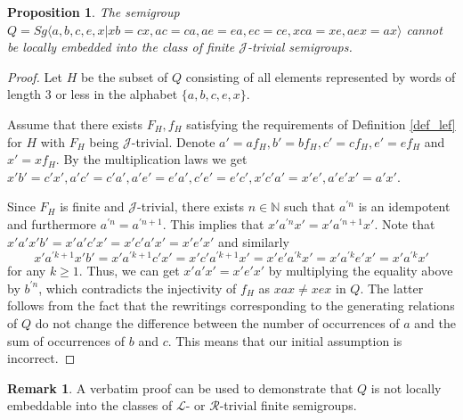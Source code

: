 \documentclass{article}
\newtheorem{proposition}{Proposition}
\theoremstyle{definition}
\newtheorem{remark}{Remark}
\def\NN{{\mathbb N}}
\def\J{\mathcal J}
\begin{document}
\begin{proposition}
The semigroup  $Q = Sg \langle a,b,c,e,x | xb = cx, ac = ca, ae=ea, ec=ce, xca = xe, aex = ax\rangle$ cannot be locally embedded into the class of finite $\J$-trivial semigroups.
\end{proposition}
\begin{proof}
Let $H$ be the subset of $Q$ consisting of all elements represented by words of length $3$ or less in the alphabet $\{a,b,c,e,x\}$.

Assume that there exists $F_H, f_H$ satisfying the requirements of Definition \ref{def_lef} for $H$ with $F_H$ being $\J$-trivial. Denote $a' = a f_H, b' =b f_H, c' = c f_H, e' = ef_H$ and $x' = x f_H$. By the multiplication laws we get $x'b' = c'x', a'c' = c'a', a'e'=e'a',c'e' =e'c', x'c'a' = x'e', a'e'x' = a'x'$.

Since $F_H$ is finite and $\J$-trivial, there exists $n \in \NN$ such that $a^{\prime n}$ is an idempotent and  furthermore $a^{\prime n}= a^{\prime n+1}$. This implies that $x' a^{\prime n} x' = x' a^{\prime n+1} x'$. Note that $x' a' x' b' = x' a' c' x' = x' c' a' x' = x' e' x'$ and similarly 
$$ x' a^{\prime k +1} x' b' = x' a^{\prime k +1} c' x' = x' c' a^{\prime k +1} x' = x' e' a^{\prime k} x'
= x' a^{\prime k} e' x' = x' a^{\prime k} x'$$ for any $k \ge 1$. Thus, we can get $x' a' x' = x' e' x'$ by multiplying the equality above by $b^{\prime n}$, which contradicts the injectivity of $f_H$ as $xax \neq xex$ in $Q$. The latter follows from the fact that the rewritings corresponding to the generating relations of $Q$ do not change the difference between the number of occurrences of $a$ and the sum of occurrences of $b$ and $c$. This means that our initial assumption is incorrect.
\end{proof}

\begin{remark}
A verbatim proof can be used to demonstrate that $Q$ is not locally embeddable into the classes of $\mathcal{L}$- or $\mathcal{R}$-trivial finite semigroups.
\end{remark}
\end{document}
